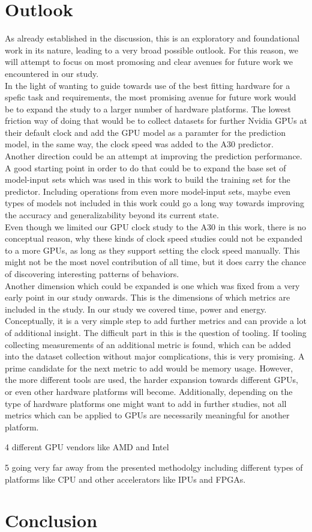 \section{Outlook}
As already established in the discussion, this is an exploratory and foundational work in its nature, leading to a very broad possible outlook. For this reason, we will attempt to focus on most promosing and clear avenues for future work we encountered in our study. \\
In the light of wanting to guide towards use of the best fitting hardware for a spefic task and requirements, the most promising avenue for future work would be to expand the study to a larger number of hardware platforms. The lowest friction way of doing that would be to collect datasets for further Nvidia GPUs at their default clock and add the GPU model as a paramter for the prediction model, in the same way, the clock speed was added to the A30 predictor. \\
Another direction could be an attempt at improving the prediction performance. A good starting point in order to do that could be to expand the base set of model-input sets which was used in this work to build the training set for the predictor. Including operations from even more model-input sets, maybe even types of models not included in this work could go a long way towards improving the accuracy and generalizability beyond its current state. \\
Even though we limited our GPU clock study to the A30 in this work, there is no conceptual reason, why these kinds of clock speed studies could not be expanded to a more GPUs, as long as they support setting the clock speed manually. This might not be the most novel contribution of all time, but it does carry the chance of discovering interesting patterns of behaviors.\\
Another dimension which could be expanded is one which was fixed from a very early point in our study onwards. This is the dimensions of which metrics are included in the study. In our study we covered time, power and energy. Conceptually, it is a very simple step to add further metrics and can provide a lot of additional insight. The difficult part in this is the question of tooling. If tooling collecting measurements of an additional metric is found, which can be added into the dataset collection without major complications, this is very promising. A prime candidate for the next metric to add would be memory usage. However, the more different tools are used, the harder expansion towards different GPUs, or even other hardware platforms will become. Additionally, depending on the type of hardware platforms one might want to add in further studies, not all metrics which can be applied to GPUs are necessarily meaningful for another platform. 


4 different GPU vendors like AMD and Intel


5 going very far away from the presented methodolgy including different types of platforms like CPU and other accelerators like IPUs and FPGAs. 




\section{Conclusion}
